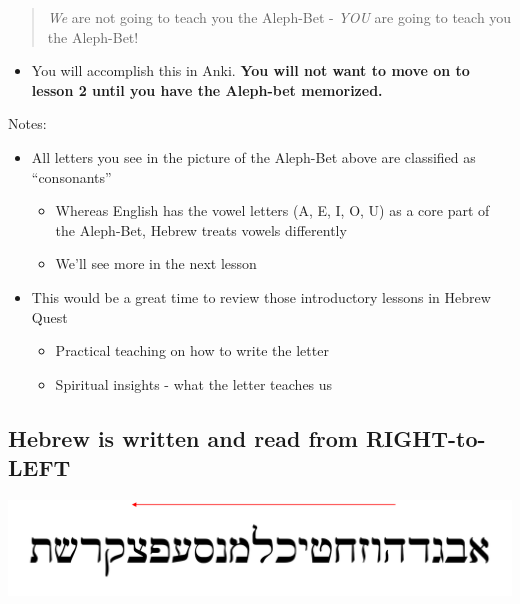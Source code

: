 \documentclass[
]{turabian-researchpaper}
\providecommand{\tightlist}{%
  \setlength{\itemsep}{0pt}\setlength{\parskip}{0pt}}
\begin{document}
\begin{quote}
\emph{We} are not going to teach you the Aleph-Bet - \emph{YOU} are going to teach you the Aleph-Bet!
\end{quote}

\begin{itemize}
\tightlist
\item
  You will accomplish this in Anki. \textbf{You will not want to move on to lesson 2 until you have the Aleph-bet memorized.}
\end{itemize}

Notes:

\begin{itemize}
\tightlist
\item
  All letters you see in the picture of the Aleph-Bet above are classified as ``consonants''

  \begin{itemize}
  \tightlist
  \item
    Whereas English has the vowel letters (A, E, I, O, U) as a core part of the Aleph-Bet, Hebrew treats vowels differently
  \item
    We'll see more in the next lesson
  \end{itemize}
\item
  This would be a great time to review those introductory lessons in Hebrew Quest

  \begin{itemize}
  \tightlist
  \item
    Practical teaching on how to write the letter
  \item
    Spiritual insights - what the letter teaches us
  \end{itemize}
\end{itemize}

\hypertarget{one_2}{%
\subsection{Hebrew is written and read from RIGHT-to-LEFT}\label{one_2}}

\begin{center}\includegraphics[width=400pt]{images/right_to_left} \end{center}
\end{document}
